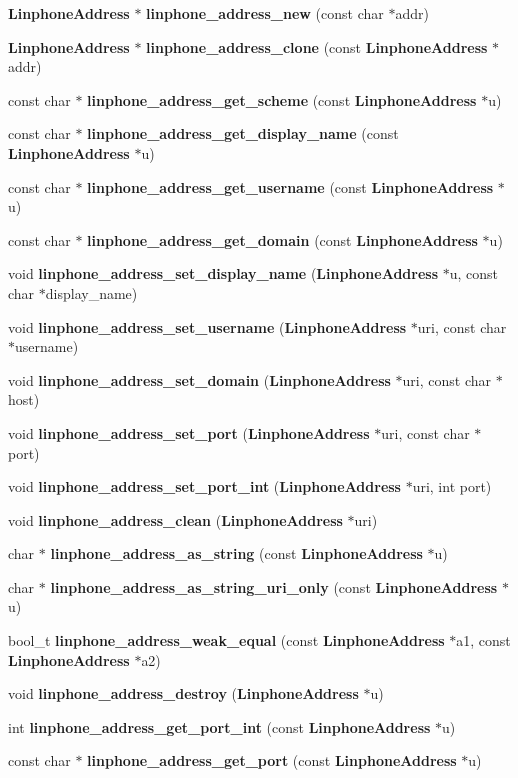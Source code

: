 \begin{DoxyCompactItemize}
\item 
{\bf \-Linphone\-Address} $\ast$ {\bf linphone\-\_\-address\-\_\-new} (const char $\ast$addr)
\item 
{\bf \-Linphone\-Address} $\ast$ {\bf linphone\-\_\-address\-\_\-clone} (const {\bf \-Linphone\-Address} $\ast$addr)
\item 
const char $\ast$ {\bf linphone\-\_\-address\-\_\-get\-\_\-scheme} (const {\bf \-Linphone\-Address} $\ast$u)
\item 
const char $\ast$ {\bf linphone\-\_\-address\-\_\-get\-\_\-display\-\_\-name} (const {\bf \-Linphone\-Address} $\ast$u)
\item 
const char $\ast$ {\bf linphone\-\_\-address\-\_\-get\-\_\-username} (const {\bf \-Linphone\-Address} $\ast$u)
\item 
const char $\ast$ {\bf linphone\-\_\-address\-\_\-get\-\_\-domain} (const {\bf \-Linphone\-Address} $\ast$u)
\item 
void {\bf linphone\-\_\-address\-\_\-set\-\_\-display\-\_\-name} ({\bf \-Linphone\-Address} $\ast$u, const char $\ast$display\-\_\-name)
\item 
void {\bf linphone\-\_\-address\-\_\-set\-\_\-username} ({\bf \-Linphone\-Address} $\ast$uri, const char $\ast$username)
\item 
void {\bf linphone\-\_\-address\-\_\-set\-\_\-domain} ({\bf \-Linphone\-Address} $\ast$uri, const char $\ast$host)
\item 
void {\bf linphone\-\_\-address\-\_\-set\-\_\-port} ({\bf \-Linphone\-Address} $\ast$uri, const char $\ast$port)
\item 
void {\bf linphone\-\_\-address\-\_\-set\-\_\-port\-\_\-int} ({\bf \-Linphone\-Address} $\ast$uri, int port)
\item 
void {\bf linphone\-\_\-address\-\_\-clean} ({\bf \-Linphone\-Address} $\ast$uri)
\item 
char $\ast$ {\bf linphone\-\_\-address\-\_\-as\-\_\-string} (const {\bf \-Linphone\-Address} $\ast$u)
\item 
char $\ast$ {\bf linphone\-\_\-address\-\_\-as\-\_\-string\-\_\-uri\-\_\-only} (const {\bf \-Linphone\-Address} $\ast$u)
\item 
bool\-\_\-t {\bf linphone\-\_\-address\-\_\-weak\-\_\-equal} (const {\bf \-Linphone\-Address} $\ast$a1, const {\bf \-Linphone\-Address} $\ast$a2)
\item 
void {\bf linphone\-\_\-address\-\_\-destroy} ({\bf \-Linphone\-Address} $\ast$u)
\item 
int {\bf linphone\-\_\-address\-\_\-get\-\_\-port\-\_\-int} (const {\bf \-Linphone\-Address} $\ast$u)
\item 
const char $\ast$ {\bf linphone\-\_\-address\-\_\-get\-\_\-port} (const {\bf \-Linphone\-Address} $\ast$u)
\end{DoxyCompactItemize}



